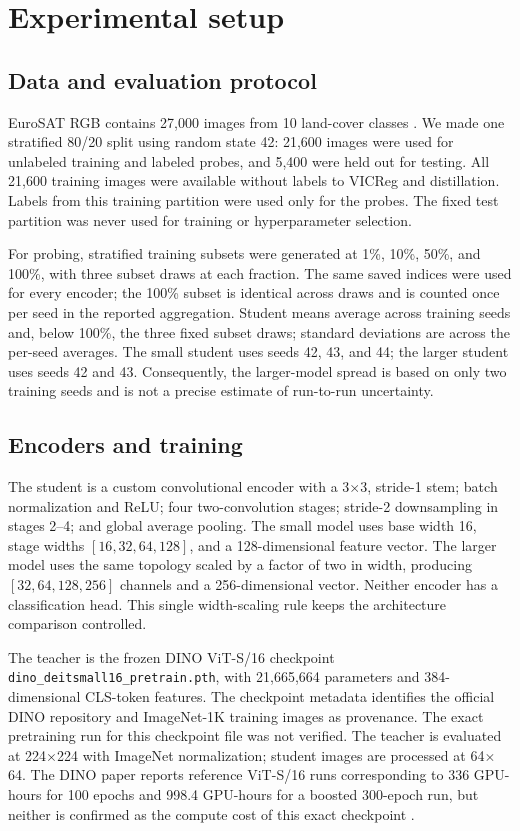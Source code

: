 \documentclass[10pt]{article}
\begin{document}
\section{Experimental setup}

\subsection{Data and evaluation protocol}

EuroSAT RGB contains 27,000 images from 10 land-cover classes
\cite{eurosat}. We made one stratified 80/20 split using random state 42:
21,600 images were used for unlabeled training and labeled probes, and
5,400 were held out for testing. All 21,600 training images were available
without labels to VICReg and distillation. Labels from this training
partition were used only for the probes. The fixed test partition was
never used for training or hyperparameter selection.

For probing, stratified training subsets were generated at 1\%, 10\%, 50\%,
and 100\%, with three subset draws at each fraction. The same saved indices
were used for every encoder; the 100\% subset is identical across draws
and is counted once per seed in the reported aggregation. Student means
average across training seeds and, below 100\%, the three fixed subset
draws; standard deviations are across the per-seed averages. The small
student uses seeds 42, 43, and 44; the larger student uses seeds 42 and 43.
Consequently, the larger-model spread is based on only two training seeds
and is not a precise estimate of run-to-run uncertainty.

\subsection{Encoders and training}

The student is a custom convolutional encoder with a 3$\times$3,
stride-1 stem; batch normalization and ReLU; four two-convolution stages;
stride-2 downsampling in stages 2--4; and global average pooling. The
small model uses base width 16, stage widths
$[16,32,64,128]$, and a 128-dimensional feature vector. The larger model
uses the same topology scaled by a factor of two in width, producing
$[32,64,128,256]$ channels and a 256-dimensional vector. Neither encoder
has a classification head. This single width-scaling rule keeps the
architecture comparison controlled.

The teacher is the frozen DINO ViT-S/16 checkpoint
\texttt{dino\_deitsmall16\_pretrain.pth}, with 21,665,664 parameters and
384-dimensional CLS-token features. The checkpoint metadata identifies
the official DINO repository and ImageNet-1K training images as provenance.
The exact pretraining run for this checkpoint file was not verified. The
teacher is evaluated at 224$\times$224 with ImageNet normalization; student
images are processed at 64$\times$64. The DINO paper reports reference
ViT-S/16 runs corresponding to 336 GPU-hours for 100 epochs and 998.4
GPU-hours for a boosted 300-epoch run, but neither is confirmed as the
compute cost of this exact checkpoint \cite{dino}.
\end{document}
